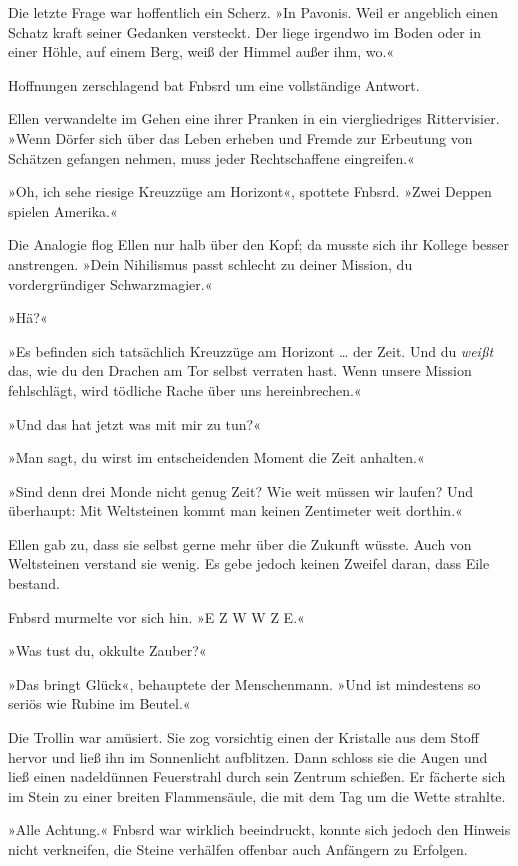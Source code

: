 Die letzte Frage war hoffentlich ein Scherz. »In Pavonis. Weil er angeblich einen Schatz kraft seiner Gedanken versteckt. Der liege irgendwo im Boden oder in einer Höhle, auf einem Berg, weiß der Himmel außer ihm, wo.«

Hoffnungen zerschlagend bat Fnbsrd um eine vollständige Antwort.

Ellen verwandelte im Gehen eine ihrer Pranken in ein viergliedriges Rittervisier. »Wenn Dörfer sich über das Leben erheben und Fremde zur Erbeutung von Schätzen gefangen nehmen, muss jeder Rechtschaffene eingreifen.«

»Oh, ich sehe riesige Kreuzzüge am Horizont«, spottete Fnbsrd. »Zwei Deppen spielen Amerika.«

Die Analogie flog Ellen nur halb über den Kopf; da musste sich ihr Kollege besser anstrengen. »Dein Nihilismus passt schlecht zu deiner Mission, du vordergründiger Schwarzmagier.«

»Hä?«

»Es befinden sich tatsächlich Kreuzzüge am Horizont … der Zeit. Und du \emph{weißt} das, wie du den Drachen am Tor selbst verraten hast. Wenn unsere Mission fehlschlägt, wird tödliche Rache über uns hereinbrechen.«

»Und das hat jetzt was mit mir zu tun?«

»Man sagt, du wirst im entscheidenden Moment die Zeit anhalten.«

»Sind denn drei Monde nicht genug Zeit? Wie weit müssen wir laufen? Und überhaupt: Mit Weltsteinen kommt man keinen Zentimeter weit dorthin.«

Ellen gab zu, dass sie selbst gerne mehr über die Zukunft wüsste. Auch von Weltsteinen verstand sie wenig. Es gebe jedoch keinen Zweifel daran, dass Eile bestand.

Fnbsrd murmelte vor sich hin. »E Z W W Z E.«

»Was tust du, okkulte Zauber?«

»Das bringt Glück«, behauptete der Menschenmann. »Und ist mindestens so seriös wie Rubine im Beutel.«

Die Trollin war amüsiert. Sie zog vorsichtig einen der Kristalle aus dem Stoff hervor und ließ ihn im Sonnenlicht aufblitzen. Dann schloss sie die Augen und ließ einen nadeldünnen Feuerstrahl durch sein Zentrum schießen. Er fächerte sich im Stein zu einer breiten Flammensäule, die mit dem Tag um die Wette strahlte.

»Alle Achtung.« Fnbsrd war wirklich beeindruckt, konnte sich jedoch den Hinweis nicht verkneifen, die Steine verhälfen offenbar auch Anfängern zu Erfolgen.

